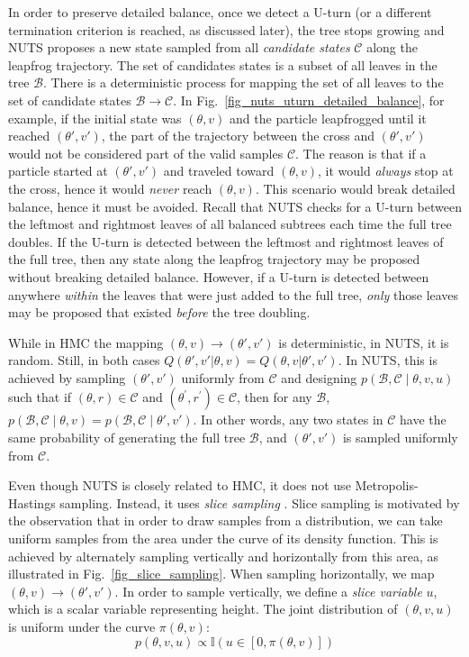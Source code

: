 \documentclass[12pt]{article}
\begin{document}
In order to preserve detailed balance, once we detect a U-turn (or a different termination criterion is reached, as discussed later), the tree stops growing and NUTS proposes a new state sampled from all \textit{candidate states} $\mathcal{C}$ along the leapfrog trajectory. The set of candidates states is a subset of all leaves in the tree $\mathcal{B}$. There is a deterministic process for mapping the set of all leaves to the set of candidate states $\mathcal{B} \rightarrow \mathcal{C}$. In Fig.\ \ref{fig_nuts_uturn_detailed_balance}, for example, if the initial state was $(\theta, v)$ and the particle leapfrogged until it reached $(\theta', v')$, the part of the trajectory between the cross and $(\theta', v')$ would not be considered part of the valid samples $\mathcal{C}$. The reason is that if a particle started at $(\theta', v')$ and traveled toward $(\theta, v)$, it would \textit{always} stop at the cross, hence it would \textit{never} reach $(\theta, v)$. This scenario would break detailed balance, hence it must be avoided. Recall that NUTS checks for a U-turn between the leftmost and rightmost leaves of all balanced subtrees each time the full tree doubles. If the U-turn is detected between the leftmost and rightmost leaves of the full tree, then any state along the leapfrog trajectory may be proposed without breaking detailed balance. However, if a U-turn is detected between anywhere \textit{within} the leaves that were just added to the full tree, \textit{only} those leaves may be proposed that existed \textit{before} the tree doubling.

While in HMC the mapping $(\theta, v) \rightarrow (\theta', v')$ is deterministic, in NUTS, it is random. Still, in both cases $Q(\theta', v'|\theta, v) = Q(\theta, v|\theta', v')$. In NUTS, this is achieved by sampling $(\theta', v')$ uniformly from $\mathcal{C}$ and designing $p(\mathcal{B}, \mathcal{C} \mid \theta, v, u)$ such that if $(\theta, r) \in \mathcal{C}$ and $\left(\theta^{\prime}, r^{\prime}\right) \in \mathcal{C}$, then for any $\mathcal{B}$, $p(\mathcal{B}, \mathcal{C} \mid \theta, v)=p(\mathcal{B}, \mathcal{C} \mid \theta', v')$. In other words, any two states in $\mathcal{C}$ have the same probability of generating the full tree $\mathcal{B}$, and $(\theta', v')$ is sampled uniformly from $\mathcal{C}$.

Even though NUTS is closely related to HMC, it does not use Metropolis-Hastings sampling. Instead, it uses \textit{slice sampling} \cite{slice_sampling}. Slice sampling is motivated by the observation that in order to draw samples from a distribution, we can take uniform samples from the area under the curve of its density function. This is achieved by alternately sampling vertically and horizontally from this area, as illustrated in Fig.\ \ref{fig_slice_sampling}. When sampling horizontally, we map $(\theta, v) \rightarrow (\theta', v')$. In order to sample vertically, we define a \textit{slice variable} $u$, which is a scalar variable representing height. The joint distribution of $(\theta, v, u)$ is uniform under the curve $\pi(\theta, v)$:
\begin{equation}
p(\theta, v, u) \propto \mathbb{I}\left(u \in\left[0, \pi(\theta, v) \right]\right)
\end{equation}
\end{document}
